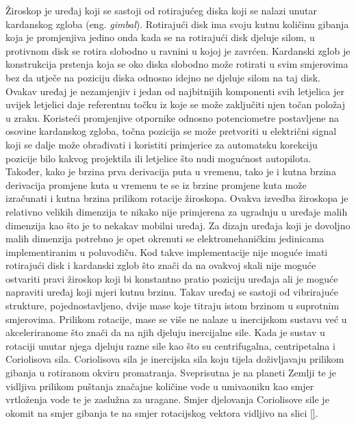\documentclass[times, utf8, diplomski]{fer}
\begin{document}
Žiroskop je uređaj koji se sastoji od rotirajućeg diska koji se nalazi unutar kardanskog zgloba (eng. \textit{gimbal}). Rotirajući
disk ima svoju kutnu količinu gibanja koja je promjenjiva jedino onda kada se na rotirajući disk djeluje silom, u protivnom
disk se rotira slobodno u ravnini u kojoj je zavrćen. Kardanski zglob je konstrukcija prstenja koja se oko diska
slobodno može rotirati u svim smjerovima bez da utječe na poziciju diska odnosno idejno ne djeluje silom na taj disk. Ovakav uređaj
je nezamjenjiv i jedan od najbitnijih komponenti svih letjelica jer uvijek letjelici daje referentnu točku iz koje se može
zaključiti njen točan položaj u zraku. Koristeći promjenjive otpornike odnosno potenciometre postavljene na osovine kardanskog zgloba,
točna pozicija se može pretvoriti u električni signal koji se dalje može obrađivati i koristiti primjerice za
automatsku korekciju pozicije bilo kakvog projektila ili letjelice što nudi mogućnost autopilota. Također, kako je brzina prva
derivacija puta u vremenu, tako je i kutna brzina derivacija promjene kuta u vremenu te se iz brzine promjene kuta može izračunati
i kutna brzina prilikom rotacije žiroskopa. Ovakva izvedba žiroskopa je
relativno velikih dimenzija te nikako nije primjerena za ugradnju u uređaje malih dimenzija kao što je to nekakav mobilni uređaj.
Za dizajn uređaja koji je dovoljno malih dimenzija potrebno je opet okrenuti se elektromehaničkim jedinicama implementiranim u poluvodiču.
Kod takve implementacije nije moguće imati rotirajući disk i kardanski zglob što znači da na ovakvoj skali nije moguće ostvariti 
pravi žiroskop koji bi konstantno pratio poziciju uređaja ali je moguće napraviti uređaj koji mjeri kutnu brzinu.
Takav uređaj se sastoji od vibrirajuće strukture, pojednostavljeno, dvije mase koje titraju istom brzinom u suprotnim smjerovima.
Prilikom rotacije, mase se više ne nalaze u inercijskom sustavu već u akceleriranome što znači da na njih djeluju inercijalne sile.
Kada je sustav u rotaciji unutar njega djeluju razne sile kao što su centrifugalna, centripetalna i Coriolisova sila.
Coriolisova sila je inercijska sila koju tijela doživljavaju prilikom gibanja u rotiranom okviru promatranja. Sveprisutna je na 
planeti Zemlji te je vidljiva prilikom puštanja značajne količine vode u umivaoniku kao smjer vrtloženja vode te je zaslužna za
uragane. Smjer djelovanja Coriolisove sile je okomit na smjer gibanja te na smjer rotacijskog vektora vidljivo na slici \ref{}.

\end{document}
